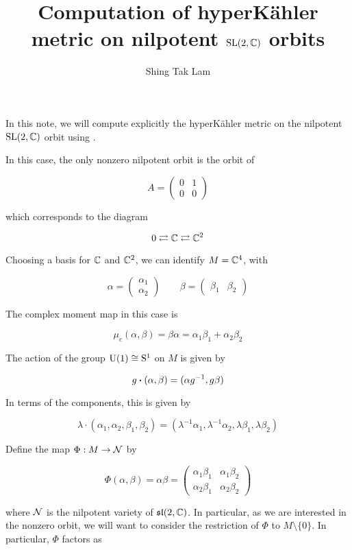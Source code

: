 \documentclass{article}
\title{Computation of hyperK\"ahler metric on nilpotent \(\operatorname{SL}(2, \mathbb{C})\) orbits}
\author{Shing Tak Lam}
\newcommand{\rla}{\rightleftarrows}
\renewcommand{\sl}{\mfs\mfl}
\begin{document}
\maketitle

In this note, we will compute explicitly the hyperK\"ahler metric on the nilpotent \(\operatorname{SL}(2, \mathbb{C})\) orbit using \cite{kobak_classical_1996}.

In this case, the only nonzero nilpotent orbit is the orbit of

\[A = \begin{pmatrix}
    0 & 1 \\
    0 & 0
\end{pmatrix}\]

which corresponds to the diagram

\[0 \rla \C \rla \C^2\]

Choosing a basis for \(\mathbb{C}\) and \(\mathbb{C}^2\), we can identify \(M = \mathbb{C}^4\), with

\[\alpha = \begin{pmatrix}
    \alpha_1 \\ \alpha_2
\end{pmatrix} \qquad \beta = \begin{pmatrix}
    \beta_1 & \beta_2
\end{pmatrix}\]

The complex moment map in this case is

\[\mu_c(\alpha, \beta) = \beta\alpha = \alpha_1 \beta_1 + \alpha_2\beta_2\]

The action of the group \(\rm U(1) \cong S^1\) on \(M\) is given by

\[g \vdot (\alpha, \beta) = (\alpha g^{-1}, g\beta)\]

In terms of the components, this is given by

\[\lambda \cdot (\alpha_1, \alpha_2, \beta_1, \beta_2) = (\lambda^{-1}\alpha_1, \lambda^{-1}\alpha_2, \lambda\beta_1, \lambda\beta_2)\]

Define the map \(\Phi : M \to \mathcal{N}\) by

\[\Phi(\alpha, \beta) = \alpha\beta = \begin{pmatrix}
    \alpha_1\beta_1 & \alpha_1\beta_2 \\
    \alpha_2\beta_1 & \alpha_2\beta_2
\end{pmatrix}\]

where \(\mathcal{N}\) is the nilpotent variety of \(\sl(2, \C)\). In particular, as we are interested in the nonzero orbit, we will want to consider the restriction of \(\Phi\) to \(M\setminus \{0\}\). In particular, \(\Phi\) factors as
\end{document}
